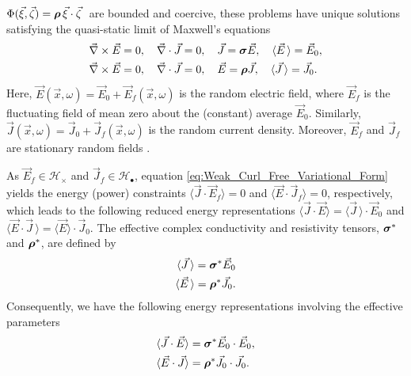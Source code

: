 \documentclass{cmslatex}
\newcommand\bsig{\mbox{\boldmath${\sigma}$}}
\newcommand\brho{\mbox{\boldmath${\rho}$}}
\begin{document}
$\Phi(\vec{\xi},\vec{\zeta})=\brho\,\vec{\xi}\cdot\vec{\zeta}\;$ are bounded and
coercive, these problems have unique solutions
\cite{Golden:CMP-473,Papanicolaou:RF-835} satisfying the quasi-static
limit of Maxwell's equations  \cite{Jackson-1999} 
%
\begin{align}   \label{eq:Maxwells_Equations_E}  
 &\vec{\nabla}\times\vec{E}=0, \quad
  \vec{\nabla}\cdot\vec{J}=0,\quad
  \vec{J}=\bsig\vec{E},\quad
  \langle\vec{E}\,\rangle=\vec{E}_0, \\
%
   &\vec{\nabla}\times\vec{E}=0, \quad
   \vec{\nabla}\cdot\vec{J}=0, \quad
   \vec{E}=\brho\vec{J},\quad
   \langle\vec{J}\,\rangle=\vec{J}_0.
   \notag  
\end{align}
%
Here, $\vec{E}(\vec{x},\omega)=\vec{E}_0+\vec{E}_f(\vec{x},\omega)$ is the
random electric field, where $\vec{E}_f$ is the fluctuating field of
mean zero about the (constant) average $\vec{E}_0$. Similarly,
$\vec{J}(\vec{x},\omega)=\vec{J}_0+\vec{J}_f(\vec{x},\omega)$ is the random  
current density. Moreover, $\vec{E}_f$ and $\vec{J}_f$ are stationary
random fields \cite{Golden:CMP-473}. 




As $\vec{E}_f\in\mathscr{H}_\times$ and $\vec{J}_f\in\mathscr{H}_\bullet$, equation
\eqref{eq:Weak_Curl_Free_Variational_Form} yields the energy (power)
\cite{Jackson-1999} constraints $\langle\vec{J}\cdot\vec{E}_f\rangle=0$ and
$\langle\vec{E}\cdot\vec{J}_f\rangle=0$, respectively, which leads to the following
reduced energy representations $\langle\vec{J}\cdot\vec{E}\rangle=\langle\vec{J}\,\rangle\cdot\vec{E}_0$
and $\langle\vec{E}\cdot\vec{J}\,\rangle=\langle\vec{E}\rangle\cdot\vec{J}_0$. The effective complex
conductivity and resistivity tensors, $\bsig^*$ and $\brho^*$, are
defined by   
%
\begin{align}\label{eq:eff_eps_def}
    \langle \vec{J} \,\rangle=  \bsig^* \vec{E}_0
    \\
    \langle \vec{E} \,\rangle=  \brho^*\vec{J}_0.
    \notag
\end{align}
%
Consequently, we have the following energy representations involving
the effective parameters 
%
\begin{align}\label{eq:Energy_Reps}
  &\langle\vec{J}\cdot\vec{E}\rangle=\bsig^*\vec{E}_0\cdot\vec{E}_0,
  \\
  &\langle\vec{E}\cdot\vec{J}\rangle=\brho^*\vec{J}_0\cdot\vec{J}_0.
  \notag
\end{align}
%
\end{document}
